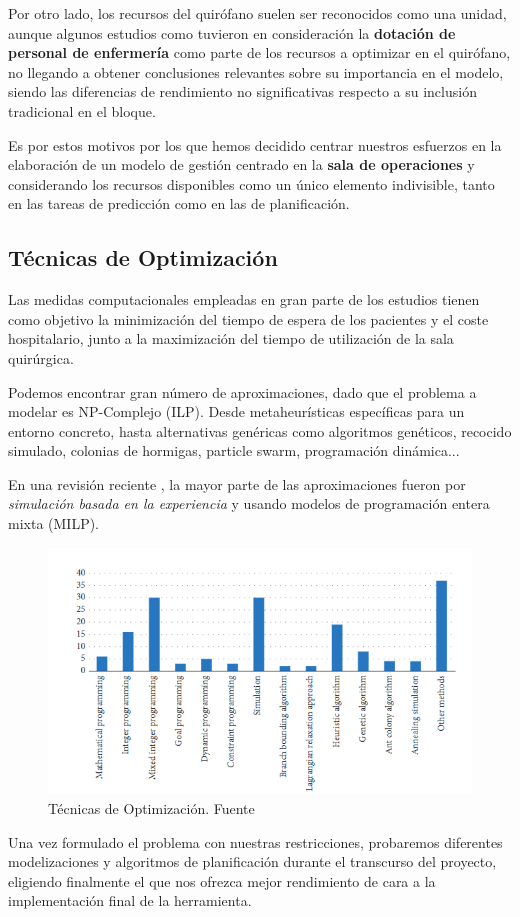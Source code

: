 Por otro lado, los recursos del quirófano suelen ser reconocidos como una unidad, aunque algunos estudios como \cite{DiMartinelly2014AnScheduling} tuvieron en consideración la \textbf{dotación de personal de enfermería }como parte de los recursos a optimizar en el quirófano, no llegando a obtener conclusiones relevantes sobre su importancia en el modelo, siendo las diferencias de rendimiento no significativas respecto a su inclusión tradicional en el bloque.

Es por estos motivos por los que hemos decidido centrar nuestros esfuerzos en la elaboración de un modelo de gestión centrado en la \textbf{sala de operaciones} y considerando los recursos disponibles como un único elemento indivisible, tanto en las tareas de predicción como en las de planificación.

\subsection{Técnicas de Optimización}
Las medidas computacionales empleadas en gran parte de los estudios tienen como objetivo la minimización del tiempo de espera de los pacientes y el coste hospitalario, junto a la maximización del tiempo de utilización de la sala quirúrgica.

Podemos encontrar gran número de aproximaciones, dado que el problema a modelar es NP-Complejo (ILP). Desde metaheurísticas específicas para un entorno concreto, hasta alternativas genéricas como algoritmos genéticos, recocido simulado, colonias de hormigas, particle swarm, programación dinámica... 

En una revisión reciente \cite{Gur2018ApplicationOverview}, la mayor parte de las aproximaciones fueron por \textit{simulación basada en la experiencia} y usando modelos de programación entera mixta (MILP).


\begin{figure}
    \centering
    \includegraphics{Memoria TFG/img/graficoAlgoritmos.png}
    \caption{Técnicas de Optimización. Fuente \cite{Gur2018ApplicationOverview}}
    \label{GraficoTecnicasOpt}
\end{figure}

Una vez formulado el problema con nuestras restricciones, probaremos diferentes modelizaciones y algoritmos de planificación durante el transcurso del proyecto, eligiendo finalmente el que nos ofrezca mejor rendimiento de cara a la implementación final de la herramienta.